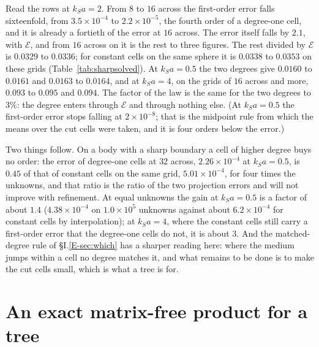 \documentclass[11pt,a4paper]{article}
\newcommand{\cE}{\mathcal{E}}
\begin{document}
Read the rows at $k_Sa=2$. From $8$ to $16$ across the first-order error falls sixteenfold, from
$3.5\times10^{-4}$ to $2.2\times10^{-5}$, the fourth order of a degree-one cell, and it is already a
fortieth of the error at $16$ across. The error itself falls by $2.1$, with $\cE$, and from $16$ across
on it is the rest to three figures. The rest divided by $\cE$ is $0.0329$ to $0.0336$; for constant
cells on the same sphere it is $0.0338$ to $0.0353$ on these grids (Table~\ref{tab:sharpsolved}). At
$k_Sa=0.5$ the two degrees give $0.0160$ to $0.0161$ and $0.0163$ to $0.0164$, and at $k_Sa=4$, on the
grids of $16$ across and more, $0.093$ to $0.095$ and $0.094$. The factor of the law is the same for the two
degrees to $3\%$: the degree enters through $\cE$ and through nothing else. (At $k_Sa=0.5$ the first-order error stops
falling at $2\times10^{-8}$; that is the midpoint rule from which the means over the cut cells were
taken, and it is four orders below the error.)

Two things follow. On a body with a sharp boundary a cell of higher degree buys no order: the error of
degree-one cells at $32$ across, $2.26\times10^{-4}$ at $k_Sa=0.5$, is $0.45$ of that of constant cells
on the same grid, $5.01\times10^{-4}$, for four times the unknowns, and that ratio is the ratio of the
two projection errors and will not improve with refinement. At equal unknowns the gain at
$k_Sa=0.5$ is a factor of about $1.4$ ($4.38\times10^{-4}$ on $1.0\times10^5$ unknowns against about
$6.2\times10^{-4}$ for constant cells by interpolation); at $k_Sa=4$, where the constant cells still
carry a first-order error that the degree-one cells do not, it is about $3$. And the matched-degree rule of
\S I.\ref{E-sec:which} has a sharper reading here: where the medium jumps within a cell no degree matches
it, and what remains to be done is to make the cut cells small, which is what a tree is for.

\section{An exact matrix-free product for a tree}\label{sec:product}
\end{document}
